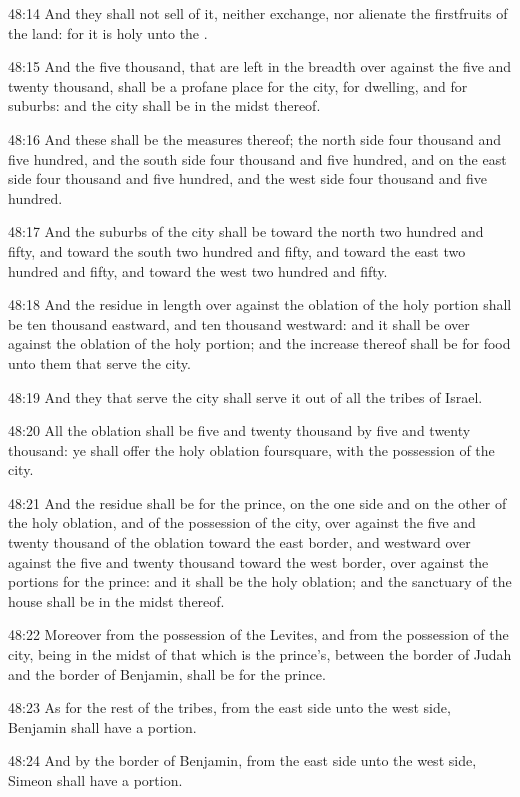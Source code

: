 48:14 And they shall not sell of it, neither exchange, nor alienate the firstfruits of the land: for it is holy unto the \LORD.

48:15 And the five thousand, that are left in the breadth over against the five and twenty thousand, shall be a profane place for the city, for dwelling, and for suburbs: and the city shall be in the midst thereof.

48:16 And these shall be the measures thereof; the north side four thousand and five hundred, and the south side four thousand and five hundred, and on the east side four thousand and five hundred, and the west side four thousand and five hundred.

48:17 And the suburbs of the city shall be toward the north two hundred and fifty, and toward the south two hundred and fifty, and toward the east two hundred and fifty, and toward the west two hundred and fifty.

48:18 And the residue in length over against the oblation of the holy portion shall be ten thousand eastward, and ten thousand westward: and it shall be over against the oblation of the holy portion; and the increase thereof shall be for food unto them that serve the city.

48:19 And they that serve the city shall serve it out of all the tribes of Israel.

48:20 All the oblation shall be five and twenty thousand by five and twenty thousand: ye shall offer the holy oblation foursquare, with the possession of the city.

48:21 And the residue shall be for the prince, on the one side and on the other of the holy oblation, and of the possession of the city, over against the five and twenty thousand of the oblation toward the east border, and westward over against the five and twenty thousand toward the west border, over against the portions for the prince: and it shall be the holy oblation; and the sanctuary of the house shall be in the midst thereof.

48:22 Moreover from the possession of the Levites, and from the possession of the city, being in the midst of that which is the prince's, between the border of Judah and the border of Benjamin, shall be for the prince.

48:23 As for the rest of the tribes, from the east side unto the west side, Benjamin shall have a portion.

48:24 And by the border of Benjamin, from the east side unto the west side, Simeon shall have a portion.

